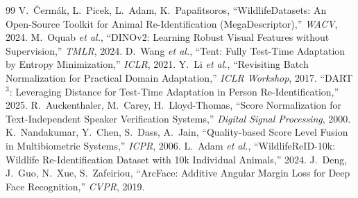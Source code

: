 \documentclass[conference]{IEEEtran}
\begin{document}
\begin{thebibliography}{99}
 V.~\v{C}erm\'ak, L.~Picek, L.~Adam, K.~Papafitsoros, ``WildlifeDatasets: An
Open-Source Toolkit for Animal Re-Identification (MegaDescriptor),'' \emph{WACV}, 2024.
 M.~Oquab \emph{et al.}, ``DINOv2: Learning Robust Visual Features without
Supervision,'' \emph{TMLR}, 2024.
 D.~Wang \emph{et al.}, ``Tent: Fully Test-Time Adaptation by Entropy
Minimization,'' \emph{ICLR}, 2021.
 Y.~Li \emph{et al.}, ``Revisiting Batch Normalization for Practical Domain
Adaptation,'' \emph{ICLR Workshop}, 2017.
 ``DART$^3$: Leveraging Distance for Test-Time Adaptation in Person
Re-Identification,'' 2025.
 R.~Auckenthaler, M.~Carey, H.~Lloyd-Thomas, ``Score Normalization for
Text-Independent Speaker Verification Systems,'' \emph{Digital Signal Processing}, 2000.
 K.~Nandakumar, Y.~Chen, S.~Dass, A.~Jain, ``Quality-based Score Level Fusion
in Multibiometric Systems,'' \emph{ICPR}, 2006.
 L.~Adam \emph{et al.}, ``WildlifeReID-10k: Wildlife Re-Identification Dataset with
10k Individual Animals,'' 2024.
 J.~Deng, J.~Guo, N.~Xue, S.~Zafeiriou, ``ArcFace: Additive Angular Margin Loss for
Deep Face Recognition,'' \emph{CVPR}, 2019.
\end{thebibliography}
\end{document}

